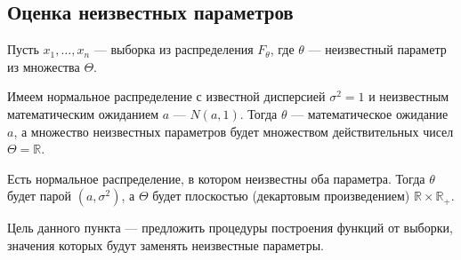 \begin{comment}
Если устремить количество полуинтервалов к бесконечности ($m\to\infty$),
то каждый полуинтервал будет сжиматься в точку.
При этом вероятность попадания $x$ в отрезок будет стремиться
к вероятности попадания $x$ в точку $y$.
Введём обозначения $|I_j|=\delta$, $I_j=\Delta_y$
$$\probabilityn{x=y}
\approx\probabilityn{x\in\Delta_y}=q_n\left(y\right)\cdot\delta,
\qquad m\to\infty$$

Очень напоминает ситуацию с плотностью распределения
непрерывной случайной величины $\xi$
$$\probability{\xi=x}\approx\pdf{x}\cdot\delta,\qquad\delta\to 0$$

Нужно отметить, что количество элементов выборки
должно стремиться к бесконечности ($n\to\infty$),
так как плотность может быть лишь у непрерывных случайных величин.
Чем больше будет элементов,
тем плотнее они будут стоять на числовой прямой.
\end{comment}
\subsection{Оценка неизвестных параметров}
Пусть $x_1, \dots, x_n$ --- выборка из распределения $F_\theta$,
где $\theta$ --- неизвестный параметр из множества $\Theta$.

\begin{example}
  Имеем нормальное распределение с известной дисперсией $\sigma^2 = 1$
  и неизвестным математическим ожиданием $a$ --- $N\left(a,1\right)$.
  Тогда $\theta$ --- математическое ожидание $a$, а множество неизвестных
  параметров будет множеством действительных чисел $\Theta = \mathbb{R}$.
\end{example}
\begin{example}
  Есть нормальное распределение, в котором неизвестны оба параметра.
  Тогда $\theta$ будет парой $\left( a,\sigma^2 \right)$,
  а $\Theta$ будет плоскостью (декартовым произведением)
  $\mathbb{R} \times \mathbb{R_+}$.
\end{example}

Цель данного пункта --- предложить процедуры построения функций от выборки,
значения которых будут заменять неизвестные параметры.

